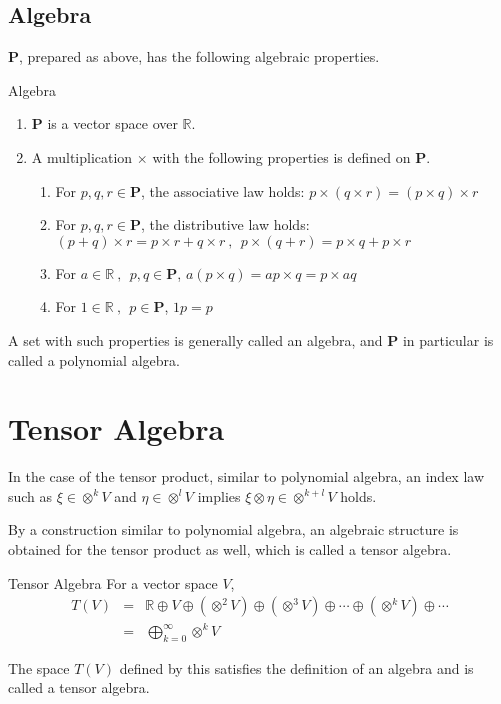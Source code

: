 \documentclass[uplatex,a4j,12pt,dvipdfmx]{jsarticle}
\begin{document}
\subsection{Algebra}

$\mathbf{P}$, prepared as above, has the following algebraic properties.

\begin{itembox}[l]{Algebra}
	\begin{enumerate}
		\item $\mathbf{P}$ is a vector space over $\mathbb{R}$.
		\item A multiplication $\times$ with the following properties is defined on $\mathbf{P}$.
		      \begin{enumerate}
			      \item For $p,q,r \in \mathbf{P}$, the associative law holds: $p \times (q \times r) = (p \times q) \times r$
			      \item For $p,q,r \in \mathbf{P}$, the distributive law holds: $(p + q) \times r = p \times r + q \times r \ , \ \ p \times (q + r) = p \times q + p \times r$
			      \item For $a \in \mathbb{R} \ , \ \ p,q \in \mathbf{P}$, $a (p \times q) = a p \times q = p \times a q$
			      \item For $1 \in \mathbb{R} \ , \ \ p \in \mathbf{P}$, $1p=p$
		      \end{enumerate}
	\end{enumerate}
\end{itembox}

A set with such properties is generally called an algebra, and $\mathbf{P}$ in particular is called a polynomial algebra.


\section{Tensor Algebra}

In the case of the tensor product, similar to polynomial algebra,
an index law such as
$\xi \in \otimes^{k} V$
and
$\eta \in \otimes^{l} V$
implies
$\xi \otimes \eta \in \otimes^{k+l} V$
holds.

By a construction similar to polynomial algebra, an algebraic structure is obtained for the tensor product as well, which is called a tensor algebra.

\begin{itembox}[l]{Tensor Algebra}
	For a vector space $V$,
	\[
		\begin{array}{rcl}
			T(V) & = & \mathbb{R} \oplus V \oplus ( \otimes^{2} V ) \oplus ( \otimes^{3} V ) \oplus \cdots \oplus ( \otimes^{k} V ) \oplus \cdots \\
			     & = & \displaystyle \bigoplus_{k=0}^{\infty} \otimes^{k} V
		\end{array}
	\]

	The space $T(V)$ defined by this satisfies the definition of an algebra and is called a tensor algebra.
\end{itembox}
\end{document}
